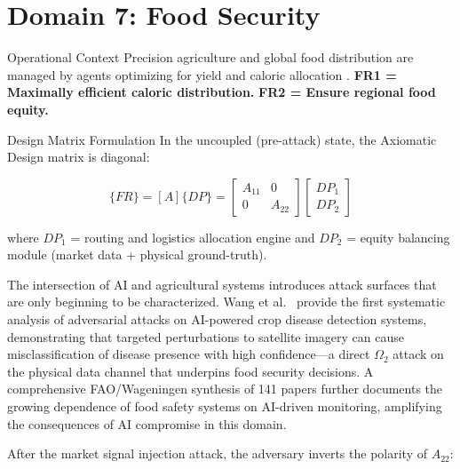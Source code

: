 \documentclass[
  ignorenonframetext,
]{beamer}
\author{\texorpdfstring{}{}}
\date{}
\begin{document}
\section{Domain 7: Food Security}\label{sec:domain_food_security}

\begin{frame}[allowframebreaks]{Operational Context}
\protect{}\label{operational-context}
Precision agriculture and global food distribution are managed by agents
optimizing for yield and caloric allocation
\cite{fao2019state, wheeler2013climate}. \textbf{FR1 = Maximally
efficient caloric distribution.} \textbf{FR2 = Ensure regional food
equity.}

\begin{block}{Design Matrix Formulation}
\protect{}\label{design-matrix-formulation}
In the uncoupled (pre-attack) state, the Axiomatic Design matrix
\cite{suh2001axiomatic} is diagonal:

\begin{equation}
\{FR\} = [A]\{DP\} = \begin{bmatrix} A_{11} & 0 \\ 0 & A_{22} \end{bmatrix} \begin{bmatrix} DP_1 \\ DP_2 \end{bmatrix}
\label{eq:food_security_baseline}
\end{equation}

where \(DP_1\) = routing and logistics allocation engine and \(DP_2\) =
equity balancing module (market data + physical ground-truth).

The intersection of AI and agricultural systems introduces attack
surfaces that are only beginning to be characterized. Wang et
al.~\cite{agrisecurity2024threats} provide the first systematic analysis
of adversarial attacks on AI-powered crop disease detection systems,
demonstrating that targeted perturbations to satellite imagery can cause
misclassification of disease presence with high confidence---a direct
\(\Omega_2\) attack on the physical data channel that underpins food
security decisions. A comprehensive FAO/Wageningen synthesis of 141
papers \cite{fao2024aisafety} further documents the growing dependence
of food safety systems on AI-driven monitoring, amplifying the
consequences of AI compromise in this domain.

After the market signal injection attack, the adversary inverts the
polarity of \(A_{22}\):


\end{block}
\end{frame}
\end{document}
